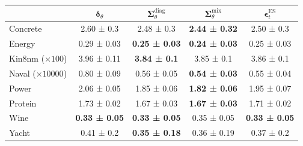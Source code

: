 \begin{tabular}{l|c|c|c|c}
\toprule
 & $\bm\delta_\theta$ & $\bm\Sigma_\theta^{\mathrm{diag}}$ & $\bm\Sigma_\theta^{\mathrm{mix}}$ & $\bm\epsilon_t^\mathrm{ES}$ \\
\midrule
Concrete & 2.60 ± 0.3 & 2.48 ± 0.3 & \textbf{2.44 ± 0.32} & 2.50 ± 0.3 \\
Energy & 0.29 ± 0.03 & \textbf{0.25 ± 0.03} & \textbf{0.24 ± 0.03} & 0.25 ± 0.03 \\
Kin8nm ($\times 100$) & 3.96 ± 0.11 & \textbf{3.84 ± 0.1} & 3.85 ± 0.1 & 3.86 ± 0.1 \\
Naval ($\times 10000$) & 0.80 ± 0.09 & 0.56 ± 0.05 & \textbf{0.54 ± 0.03} & 0.55 ± 0.04 \\
Power & 2.06 ± 0.05 & 1.85 ± 0.06 & \textbf{1.82 ± 0.06} & 1.95 ± 0.07 \\
Protein & 1.73 ± 0.02 & 1.67 ± 0.03 & \textbf{1.67 ± 0.03} & 1.71 ± 0.02 \\
Wine & \textbf{0.33 ± 0.05} & \textbf{0.33 ± 0.05} & 0.35 ± 0.05 & \textbf{0.33 ± 0.05} \\
Yacht & 0.41 ± 0.2 & \textbf{0.35 ± 0.18} & 0.36 ± 0.19 & 0.37 ± 0.2 \\
\bottomrule
\end{tabular}
